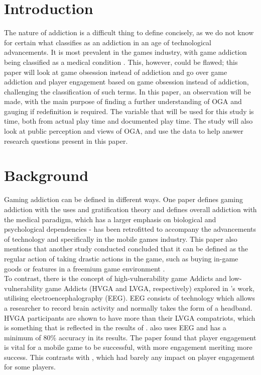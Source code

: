\documentclass[conference]{IEEEtran}
\begin{document}
\section{Introduction}
The nature of addiction is a difficult thing to define concisely, as we do not know for certain what classifies as an addiction in an age of technological advancements. It is most prevalent in the games industry, with game addiction being classified as a medical condition \cite{NHSHamp24}. This, however, could be flawed; this paper will look at game obsession instead of addiction and go over game addiction and player engagement based on game obsession instead of addiction, challenging the classification of such terms. In this paper, an observation will be made, with the main purpose of finding a further understanding of OGA and gauging if redefinition is required. The variable that will be used for this study is time, both from actual play time and documented play time. The study will also look at public perception and views of OGA, and use the data to help answer research questions present in this paper.

\section{Background}
Gaming addiction can be defined in different ways. One paper \cite{yasir2021} defines gaming addiction with the uses and gratification theory and defines overall addiction with the medical paradigm, which has a larger emphasis on biological and psychological dependencies - has been retrofitted to accompany the advancements of technology and specifically in the mobile games industry. This paper also mentions that another study conducted concluded that it can be defined as the regular action of taking drastic actions in the game, such as buying in-game goods or features in a freemium game environment \cite{XWang2021}. \\

To contrast, there is the concept of high-vulnerability game Addicts and low-vulnerability game Addicts (HVGA and LVGA, respectively) explored in \cite{Jing2024}’s work, utilising electroencephalography (EEG). EEG consists of technology which allows a researcher to record brain activity and normally takes the form of a headband. HVGA participants are shown to have more than their LVGA compatriots, which is something that is reflected in the results of \cite{Naaj2021}. \cite{Ruqeyya2022} also uses EEG and has a minimum of 80\% accuracy in its results. The paper found that player engagement is vital for a mobile game to be successful, with more engagement meriting more success. This contrasts with \cite{Schlagowski2024}, which had barely any impact on player engagement for some players.
\end{document}
